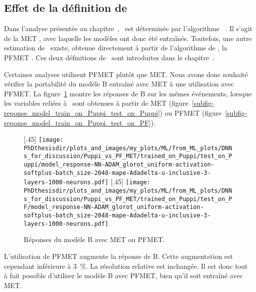 \subsection{Effet de la définition de \MET}
\def\Bpf{$\text{B}^\text{PF}$}
Dans l'analyse présentée au chapitre~,
\MET\ est déterminée par l'algorithme \PUPPI~\cite{PUPPI}.
Il s'agit de la \og \PUPPI MET \fg,
avec laquelle les modèles ont donc été entraînés.
Toutefois, une autre estimation de \MET\ existe, obtenue directement à partir de l'algorithme de \PF,
la \og PFMET \fg.
Ces deux définitions de \MET\ sont introduites dans le chapitre~.
\par
Certaines analyses utilisent PFMET plutôt que \PUPPI MET.
Nous avons donc souhaité vérifier la portabilité du modèle B
entraîné avec \PUPPI MET à une utilisation avec PFMET.
La figure~\ref{fig-MET-PF-PUPPI-B} montre les réponses de B
sur les mêmes événements,
lorsque les variables reliées à \MET\ sont obtenues à partir de
\PUPPI MET (figure~\ref{subfig-reponse_model_train_on_Puppi_test_on_Puppi})
ou
PFMET (figure~\ref{subfig-reponse_model_train_on_Puppi_test_on_PF}).
\begin{figure}[h]
\centering

[.45\textwidth]
{\texttt{[image: \\PhDthesisdir/plots\_and\_images/my\_plots/ML/from\_ML\_plots/DNNs\_for\_discussion/Puppi\_vs\_PF\_MET/trained\_on\_Puppi/test\_on\_Puppi/model\_response-NN-ADAM\_glorot\_uniform-activation-softplus-batch\_size-2048-mape-Adadelta-u-inclusive-3-layers-1000-neurons.pdf]}\vspace{-.5\baselineskip}}
\hfill
{}[.45\textwidth]
{\texttt{[image: \\PhDthesisdir/plots\_and\_images/my\_plots/ML/from\_ML\_plots/DNNs\_for\_discussion/Puppi\_vs\_PF\_MET/trained\_on\_Puppi/test\_on\_PF/model\_response-NN-ADAM\_glorot\_uniform-activation-softplus-batch\_size-2048-mape-Adadelta-u-inclusive-3-layers-1000-neurons.pdf]}\vspace{-.5\baselineskip}}

\caption{Réponses du modèle B avec \PUPPI MET ou PFMET.}
\label{fig-MET-PF-PUPPI-B}
\end{figure}
\par
L'utilisation de PFMET augmente la réponse de B.
Cette augmentation est cependant inférieure à \SI{3}{\%}.
La résolution relative est inchangée.
Il est donc tout à fait possible d'utiliser le modèle B avec PFMET, bien qu'il soit entraîné avec \PUPPI MET.
